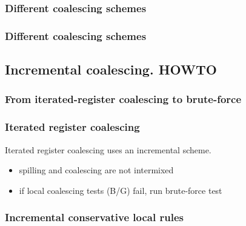 \subsubsection*{Different coalescing schemes}
\begin{frame}[label=past]
\frametitle{Different coalescing schemes}
\vfill
 \centering{
   
 }
\end{frame}


\subsection*{Incremental coalescing. HOWTO}

\subsubsection*{From iterated-register coalescing to {\sf brute-force}}
\begin{frame}[label=past]
\frametitle{Iterated register coalescing}
\begin{block}{}
Iterated register coalescing uses an incremental scheme.
\end{block}

%
%
%
%
%
\begin{itemize}
  \item<2-|handout:2>[\txtimpl] spilling and coalescing are not intermixed
  \item<5-|handout:2>[\txtimpl] if local coalescing tests (B/G) fail, run
  \textsf{brute-force} test
\end{itemize}
\end{frame}

\begin{frame}[label=rules]
  \frametitle{Incremental conservative local rules}
  
\end{frame}

